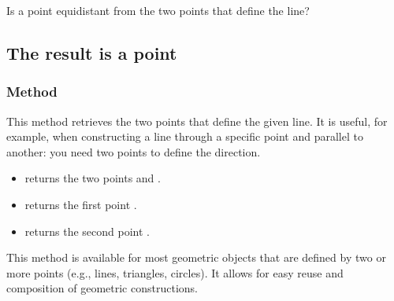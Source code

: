 Is a point equidistant from the two points that define the line?

\begin{tkzexample}[latex=.5\textwidth]
\begin{center}
\end{center}
\end{tkzexample}

\subsection{The result is a point}



\subsubsection{Method }
\label{ssub:method_line_get}

This method retrieves the two points that define the given line. It is useful, for example, when constructing a line through a specific point and parallel to another: you need two points to define the direction.

\begin{itemize}
  \item {} returns the two points  and .
  \item {} returns the first point .
  \item {} returns the second point .
\end{itemize}

This method is available for most geometric objects that are defined by two or more points (e.g., lines, triangles, circles). It allows for easy reuse and composition of geometric constructions.


\begin{tkzexample}[latex=.35\textwidth]

\end{tkzexample}


